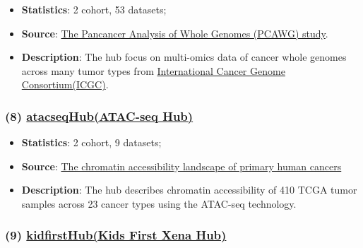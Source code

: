 \documentclass[
]{book}
\providecommand{\tightlist}{%
  \setlength{\itemsep}{0pt}\setlength{\parskip}{0pt}}
\begin{document}
\begin{itemize}
\tightlist
\item
  \textbf{Statistics}: 2 cohort, 53 datasets;
\item
  \textbf{Source}: \href{https://xenabrowser.net/datapages/?host=https\%3A\%2F\%2Fpcawg.xenahubs.net&removeHub=https\%3A\%2F\%2Fxena.treehouse.gi.ucsc.edu\%3A443}{The Pancancer Analysis of Whole Genomes (PCAWG) study}.
\item
  \textbf{Description}: The hub focus on multi-omics data of cancer whole genomes across many tumor types from \href{https://dcc.icgc.org/}{International Cancer Genome Consortium(ICGC)}.
\end{itemize}

\subsubsection*{\texorpdfstring{(8) \href{https://xenabrowser.net/datapages/?host=https\%3A\%2F\%2Fatacseq.xenahubs.net}{atacseqHub(ATAC-seq Hub)}}{(8) atacseqHub(ATAC-seq Hub)}}\label{atacseqhubatac-seq-hub}

\begin{itemize}
\tightlist
\item
  \textbf{Statistics}: 2 cohort, 9 datasets;
\item
  \textbf{Source}: \href{https://www.science.org/doi/10.1126/science.aav1898}{The chromatin accessibility landscape of primary human cancers}
\item
  \textbf{Description}: The hub describes chromatin accessibility of 410 TCGA tumor samples across 23 cancer types using the ATAC-seq technology.
\end{itemize}

\subsubsection*{\texorpdfstring{(9) \href{https://xenabrowser.net/datapages/?host=https\%3A\%2F\%2Fkidsfirst.xenahubs.net&removeHub=https\%3A\%2F\%2Fxena.treehouse.gi.ucsc.edu\%3A443}{kidfirstHub(Kids First Xena Hub)}}{(9) kidfirstHub(Kids First Xena Hub)}}\label{kidfirsthubkids-first-xena-hub}
\end{document}
